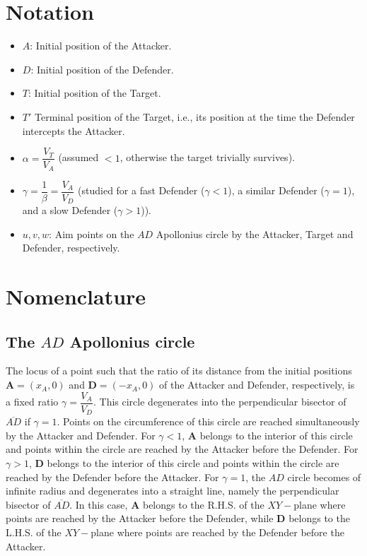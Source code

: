\section{Notation}
\begin{itemize}
\item $A$: Initial position of the Attacker.
\item $D$: Initial position of the Defender.
\item $T$: Initial position of the Target.
\item $T'$ Terminal position of the Target, i.e., its position at the time the Defender intercepts the Attacker.
\item $\alpha=\dfrac{V_{T}}{V_{A}}$ (assumed $<1$, otherwise the target trivially survives).
\item $\gamma=\dfrac{1}{\beta}=\dfrac{V_{A}}{V_{D}}$ (studied for a fast Defender ($\gamma<1$), a similar Defender ($\gamma=1$), and a slow Defender ($\gamma>1$)).
\item $u, v, w$: Aim points on the $AD$ Apollonius circle by the Attacker, Target and Defender, respectively. 
\end{itemize}

\section{Nomenclature}
\subsection{The $AD$ Apollonius circle}
The locus of a point such that the ratio of its distance from the initial positions $\boldsymbol{A}=(x_{A},0)$ and $\boldsymbol{D}=(-x_{A},0)$ of the Attacker and Defender, respectively, is a fixed ratio $\gamma=\dfrac{V_{A}}{V_{D}}$. This circle degenerates into the perpendicular bisector of $\overline{AD}$ if $\gamma=1$.
Points on the circumference of this circle are reached simultaneously by the Attacker and Defender. For $\gamma<1$, $\boldsymbol{A}$ belongs to the interior of this circle and points within the circle are reached by the Attacker before the Defender. For $\gamma>1$, $\boldsymbol{D}$ belongs to the interior of this circle and points within the circle are reached by the Defender before the Attacker. For $\gamma=1$, the $AD$ circle becomes of infinite radius and degenerates into a straight line, namely the perpendicular bisector of $\overline{AD}$. In this case, $\boldsymbol{A}$ belongs to the R.H.S. of the $XY-$plane where points are reached by the Attacker before the Defender, while $\boldsymbol{D}$ belongs to the L.H.S. of the $XY-$plane where points are reached by the Defender before the Attacker.   

